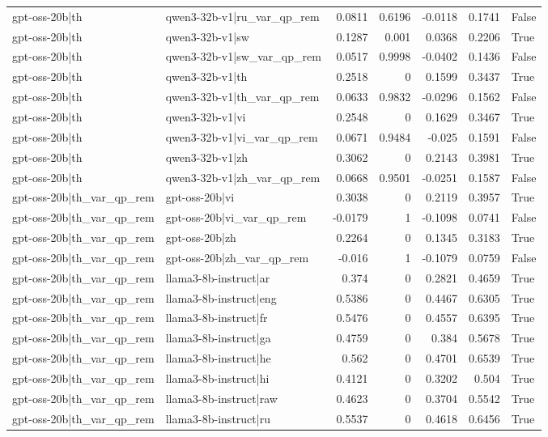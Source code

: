 \begin{table}
\begin{tabular}{l l r r r r l}
gpt-oss-20b|th & qwen3-32b-v1|ru_var_qp_rem & 0.0811 & 0.6196 & -0.0118 & 0.1741 & False \\
gpt-oss-20b|th & qwen3-32b-v1|sw & 0.1287 & 0.001 & 0.0368 & 0.2206 & True \\
gpt-oss-20b|th & qwen3-32b-v1|sw_var_qp_rem & 0.0517 & 0.9998 & -0.0402 & 0.1436 & False \\
gpt-oss-20b|th & qwen3-32b-v1|th & 0.2518 & 0 & 0.1599 & 0.3437 & True \\
gpt-oss-20b|th & qwen3-32b-v1|th_var_qp_rem & 0.0633 & 0.9832 & -0.0296 & 0.1562 & False \\
gpt-oss-20b|th & qwen3-32b-v1|vi & 0.2548 & 0 & 0.1629 & 0.3467 & True \\
gpt-oss-20b|th & qwen3-32b-v1|vi_var_qp_rem & 0.0671 & 0.9484 & -0.025 & 0.1591 & False \\
gpt-oss-20b|th & qwen3-32b-v1|zh & 0.3062 & 0 & 0.2143 & 0.3981 & True \\
gpt-oss-20b|th & qwen3-32b-v1|zh_var_qp_rem & 0.0668 & 0.9501 & -0.0251 & 0.1587 & False \\
gpt-oss-20b|th_var_qp_rem & gpt-oss-20b|vi & 0.3038 & 0 & 0.2119 & 0.3957 & True \\
gpt-oss-20b|th_var_qp_rem & gpt-oss-20b|vi_var_qp_rem & -0.0179 & 1 & -0.1098 & 0.0741 & False \\
gpt-oss-20b|th_var_qp_rem & gpt-oss-20b|zh & 0.2264 & 0 & 0.1345 & 0.3183 & True \\
gpt-oss-20b|th_var_qp_rem & gpt-oss-20b|zh_var_qp_rem & -0.016 & 1 & -0.1079 & 0.0759 & False \\
gpt-oss-20b|th_var_qp_rem & llama3-8b-instruct|ar & 0.374 & 0 & 0.2821 & 0.4659 & True \\
gpt-oss-20b|th_var_qp_rem & llama3-8b-instruct|eng & 0.5386 & 0 & 0.4467 & 0.6305 & True \\
gpt-oss-20b|th_var_qp_rem & llama3-8b-instruct|fr & 0.5476 & 0 & 0.4557 & 0.6395 & True \\
gpt-oss-20b|th_var_qp_rem & llama3-8b-instruct|ga & 0.4759 & 0 & 0.384 & 0.5678 & True \\
gpt-oss-20b|th_var_qp_rem & llama3-8b-instruct|he & 0.562 & 0 & 0.4701 & 0.6539 & True \\
gpt-oss-20b|th_var_qp_rem & llama3-8b-instruct|hi & 0.4121 & 0 & 0.3202 & 0.504 & True \\
gpt-oss-20b|th_var_qp_rem & llama3-8b-instruct|raw & 0.4623 & 0 & 0.3704 & 0.5542 & True \\
gpt-oss-20b|th_var_qp_rem & llama3-8b-instruct|ru & 0.5537 & 0 & 0.4618 & 0.6456 & True \\

\end{tabular}
\end{table}

